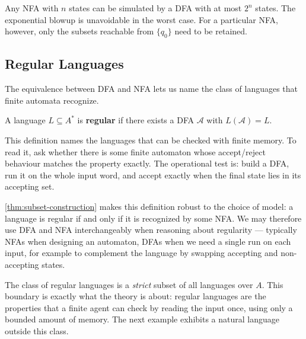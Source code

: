 \begin{takeaway}
Any NFA with $n$ states can be simulated by a DFA with at most $2^n$ states.
The exponential blowup is unavoidable in the worst case.  For a particular
NFA, however, only the subsets reachable from $\{q_0\}$ need to be retained.
\end{takeaway}

\subsection{Regular Languages}
\label{subsec:regular-languages}

The equivalence between DFA and NFA lets us name the class of languages
that finite automata recognize.

\begin{definition}
\label{def:regular-language}
A language $L \subseteq A^*$ is \textbf{regular} if there exists a
DFA $\mathcal{A}$ with $L(\mathcal{A})=L$.
\end{definition}

This definition names the languages that can be checked with finite
memory.  To read it, ask whether there is some finite automaton whose
accept/reject behaviour matches the property exactly.  The operational
test is: build a DFA, run it on the whole input word, and accept exactly
when the final state lies in its accepting set.

\cref{thm:subset-construction} makes this definition robust to the
choice of model: a language is regular if and only if it is recognized
by some NFA.  We may therefore use DFA and NFA interchangeably when
reasoning about regularity --- typically NFAs when designing an
automaton, DFAs when we need a single run on each input, for example to
complement the language by swapping accepting and non-accepting states.

The class of regular languages is a \emph{strict} subset of all
languages over $A$.  This boundary is exactly what the theory is
about: regular languages are the properties that a finite agent can
check by reading the input once, using only a bounded amount of memory.
The next example exhibits a natural language outside this class.


